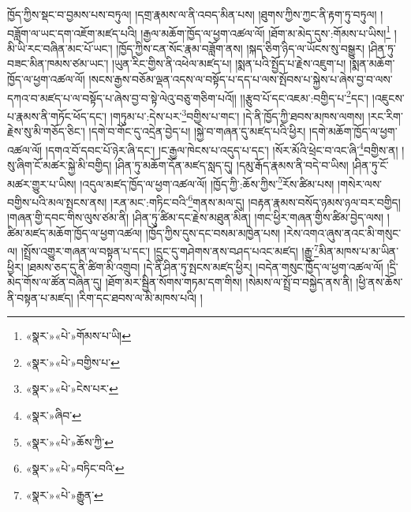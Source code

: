 ཁྱོད་ཀྱིས་སྡང་བ་བྱམས་པས་བཏུལ། །དགྲ་རྣམས་ལ་ནི་འབད་མིན་པས། །ཐུགས་ཀྱིས་ཀྱང་ནི་རྟག་ཏུ་བཏུལ། །བཟློག་ལ་ཡང་དག་འཇོག་མཛད་པའི། །རྒྱལ་མཆོག་ཁྱོད་ལ་ཕྱག་འཚལ་ལོ། །ཐོག་མ་མེད་དུས་:གོམས་པ་ཡིས།\footnote{«སྣར་»«པེ་»གོམས་པ་ཡི།} །མི་ཡི་རང་བཞིན་མང་པོ་ཡང་། །ཁྱོད་ཀྱིས་ངན་སོང་རྣམ་བཟློག་ནས། །སྐད་ཅིག་ཉིད་ལ་ཡོངས་སུ་བསྒྱུར། །ཤིན་ཏུ་བཟང་མིན་ཁམས་ཙམ་ཡང་། །ཡུན་རིང་གྱིས་ནི་འཕེལ་མཛད་པ། །སྨན་པའི་སྤྱོད་པ་རྗེས་འཇུག་པ། །སྨན་མཆོག་ཁྱོད་ལ་ཕྱག་འཚལ་ལོ། །སངས་རྒྱས་བཅོམ་ལྡན་འདས་ལ་བསྟོད་པ་དད་པ་ལས་སྤོབས་པ་སྐྱེས་པ་ཞེས་བྱ་བ་ལས་དཀའ་བ་མཛད་པ་ལ་བསྟོད་པ་ཞེས་བྱ་བ་སྟེ་ལེའུ་བཅུ་གཅིག་པའོ།། །།རྩུབ་པོ་དང་འཇམ་:བགྱིད་པ་\footnote{«སྣར་»«པེ་»བགྱིས་པ་}དང་། །འཇུངས་པ་རྣམས་ནི་གཏོང་ཕོད་དང་། །གཏུམ་པ་:དེས་པར་\footnote{«སྣར་»«པེ་»ངེས་པར་}བགྱིས་པ་གང་། །དེ་ནི་ཁྱོད་ཀྱི་ཐབས་མཁས་ལགས། །རང་རིག་རྗེས་སུ་མི་གཅོད་ཅིང་། །དགེ་བ་གོང་དུ་འདྲེན་བྱེད་པ། །སྐྱེ་བ་གཞན་དུ་མཛད་པའི་ཕྱིར། །དགེ་མཆོག་ཁྱོད་ལ་ཕྱག་འཚལ་ལོ། །དགའ་བོ་དབང་པོ་ཉེར་ཞི་དང་། །ང་རྒྱལ་ཁེངས་པ་འདུད་པ་དང་། །སོར་མོའི་ཕྲེང་བ་འང་ཞི་\footnote{«སྣར་»ཞིབ་}བགྱིས་ན། །སུ་ཞིག་ངོ་མཚར་སྐྱེ་མི་བགྱིད། །ཤིན་ཏུ་མཆོག་དོན་མཛད་སླད་དུ། །དམུ་རྒོད་རྣམས་ནི་བདེ་བ་ཡིས། །ཤིན་ཏུ་ངོ་མཚར་གྱུར་པ་ཡིས། །འདུལ་མཛད་ཁྱོད་ལ་ཕྱག་འཚལ་ལོ། །ཁྱོད་ཀྱི་:ཆོས་ཀྱིས་\footnote{«སྣར་»«པེ་»ཆོས་ཀྱི་}རོས་ཚིམ་པས། །གསེར་ལས་བགྱིས་པའི་མལ་སྤངས་ནས། །རན་མང་:གཏིང་བའི་\footnote{«སྣར་»«པེ་»བཏིང་བའི་}གནས་མལ་དུ། །བརྟན་རྣམས་བསོད་ཉམས་ཉལ་བར་བགྱིད། །གཞན་གྱི་དབང་གིས་ལུས་ཙམ་ནི། །ཤིན་ཏུ་ཚིམ་དང་རྗེས་མཐུན་མིན། །གང་ཕྱིར་གཞན་གྱིས་ཚིམ་བྱེད་ལས། །ཚིམ་མཛད་མཆོག་ཁྱོད་ལ་ཕྱག་འཚལ། །ཁྱོད་ཀྱིས་དུས་དང་བསམ་མཁྱེན་པས། །རེས་འགའ་ཞུས་ནའང་མི་གསུང་ལ། །སྤྲོས་འགྱུར་གཞན་ལ་བསྟན་པ་དང་། །དྲུང་དུ་གཤེགས་ནས་བཤད་པའང་མཛད། །རྒྱུ་\footnote{«སྣར་»«པེ་»རྒྱུན་}མིན་མཁས་པ་མ་ཡིན་ཕྱིར། །ཐམས་ཅད་དུ་ནི་ཚིག་མི་འགྲུབ། །དེ་ནི་ཤིན་ཏུ་སྤངས་མཛད་ཕྱིར། །བདེན་གསུང་ཁྱོད་ལ་ཕྱག་འཚལ་ལོ། །དྲི་མེད་གོས་ལ་ཚོན་བཞིན་དུ། །ཐོག་མར་སྦྱིན་སོགས་གཏམ་དག་གིས། །སེམས་ལ་སྤྲོ་བ་བསྐྱེད་ནས་ནི། །ཕྱི་ནས་ཆོས་ནི་བསྟན་པ་མཛད། །རིག་དང་ཐབས་ལ་མི་མཁས་པའི། །
